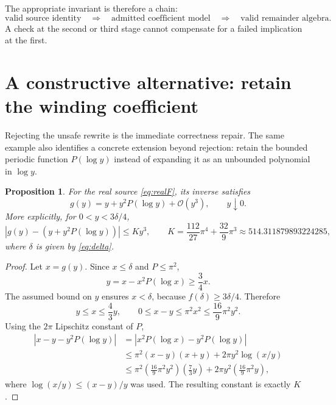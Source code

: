 \documentclass[11pt,a4paper]{article}
\newcommand{\OO}{\mathcal{O}}
\newtheorem{proposition}{Proposition}[section]
\begin{document}
The appropriate invariant is therefore a chain:
\[
 \text{valid source identity}
 \quad\Longrightarrow\quad
 \text{admitted coefficient model}
 \quad\Longrightarrow\quad
 \text{valid remainder algebra}.
\]
A check at the second or third stage cannot compensate for a failed implication
at the first.

\section{A constructive alternative: retain the winding coefficient}\label{sec:constructive}

Rejecting the unsafe rewrite is the immediate correctness repair. The same
example also identifies a concrete extension beyond rejection: retain the bounded
periodic function $P(\log y)$ instead of expanding it as an unbounded polynomial
in $\log y$.

\begin{proposition}\label{prop:goodinverse}
For the real source \eqref{eq:realF}, its inverse satisfies
\begin{equation}\label{eq:goodinverse}
 g(y)=y+y^2P(\log y)+\OO(y^3),\qquad y\downarrow0.
\end{equation}
More explicitly, for $0<y<3\delta/4$,
\begin{equation}\label{eq:explicitbound}
 \left|g(y)-\left(y+y^2P(\log y)\right)\right|
 \le K y^3,
 \qquad
 K=\frac{112}{27}\pi^4+\frac{32}{9}\pi^3
   \approx514.311879893224285,
\end{equation}
where $\delta$ is given by \eqref{eq:delta}.
\end{proposition}
\begin{proof}
Let $x=g(y)$. Since $x\le\delta$ and $P\le\pi^2$,
\[
 y=x-x^2P(\log x)\ge\frac34x.
\]
The assumed bound on $y$ ensures $x<\delta$, because
$f(\delta)\ge3\delta/4$. Therefore
\[
 y\le x\le\frac43y,
 \qquad 0\le x-y\le\pi^2x^2\le\frac{16}{9}\pi^2y^2.
\]
Using the $2\pi$ Lipschitz constant of $P$,
\begin{align*}
 |x-y-y^2P(\log y)|
 &=|x^2P(\log x)-y^2P(\log y)|\\
 &\le\pi^2(x-y)(x+y)+2\pi y^2\log(x/y)\\
 &\le\pi^2\left(\frac{16}{9}\pi^2y^2\right)
              \left(\frac73y\right)
      +2\pi y^2\left(\frac{16}{9}\pi^2y\right),
\end{align*}
where $\log(x/y)\le(x-y)/y$ was used. The resulting constant is exactly $K$.
\end{proof}
\end{document}
